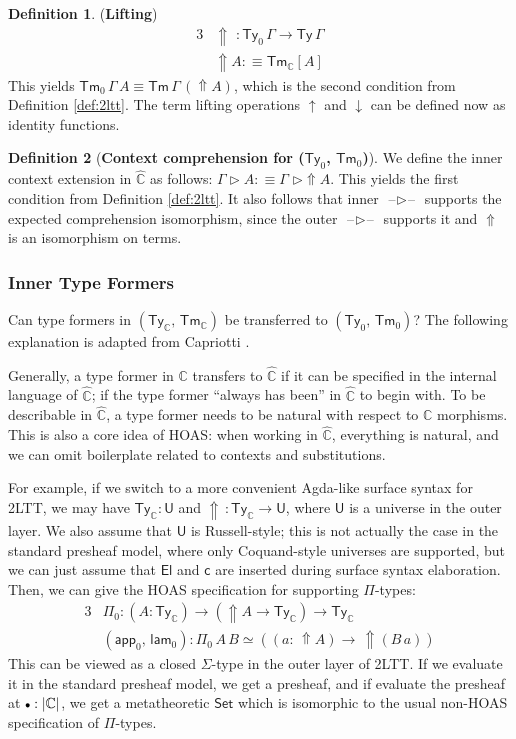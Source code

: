 \documentclass[12pt,a4paper,twoside,openany]{book}
\theoremstyle{remark}
\theoremstyle{definition}
\newtheorem{mydefinition}{Definition}
\newcommand{\ms}[1]{\mathsf{#1}}
\newcommand{\mbb}[1]{\mathbb{#1}}
\newcommand{\Tm}{\mathsf{Tm}}
\newcommand{\Ty}{\mathsf{Ty}}
\newcommand{\U}{\mathsf{U}}
\newcommand{\El}{\mathsf{El}}
\newcommand{\blank}{\mathord{\hspace{1pt}\text{--}\hspace{1pt}}}
\newcommand{\Set}{\mathsf{Set}}
\newcommand{\Lift}{\Uparrow}
\newcommand{\ext}{\triangleright}
\newcommand{\emptycon}{\scaleobj{.75}\bullet}
\newcommand{\app}{\ms{app}}
\newcommand{\mbbC}{\mbb{C}}
\newcommand{\hmbbC}{\hat{\mbb{C}}}
\newcommand{\lam}{\ms{lam}}
\newcommand{\up}{\uparrow}
\newcommand{\down}{\downarrow}
\newcommand{\defn}{:\equiv}
\begin{document}
\begin{mydefinition}(\textbf{Lifting})
\begin{alignat*}{3}
  & \Lift\,\,: \Ty_{0}\,\Gamma \to \Ty\,\Gamma \\
  & \Lift\!A \defn \Tm_{\mbbC}[A]
\end{alignat*}
This yields $\Tm_{0}\,\Gamma\,A \equiv
\Tm\,\Gamma\,(\Lift\!A)$, which is the second condition from
Definition \ref{def:2ltt}. The term lifting operations $\up$ and $\down$ can
be defined now as identity functions.
\end{mydefinition}

\begin{mydefinition}[\textbf{Context comprehension for ($\Ty_{0}$, $\Tm_{0}$)}]
We define the inner context extension in $\hmbbC$ as follows: $\Gamma \ext A
\defn \Gamma\,\,\ext\Lift\!A$. This yields the first condition from Definition
\ref{def:2ltt}. It also follows that inner $\blank\ext\blank$ supports the
expected comprehension isomorphism, since the outer $\blank\ext\blank$ supports
it and $\Lift$ is an isomorphism on terms.
\end{mydefinition}

\subsubsection{Inner Type Formers}

Can type formers in $(\Ty_{\mbbC},\,\Tm_{\mbbC})$ be transferred to
$(\Ty_0,\,\Tm_0)$? The following explanation is adapted from Capriotti
\cite[Section 2.3]{TODO}.

Generally, a type former in $\mbbC$ transfers to $\hmbbC$ if it can be specified
in the internal language of $\hmbbC$; if the type former ``always has been'' in
$\hmbbC$ to begin with. To be describable in $\hmbbC$, a type former needs to be
natural with respect to $\mbbC$ morphisms. This is also a core idea of HOAS: when
working in $\hmbbC$, everything is natural, and we can omit boilerplate related
to contexts and substitutions.

For example, if we switch to a more convenient Agda-like surface syntax for
2LTT, we may have $\Ty_{\mbbC} : \U$ and $\Lift\,: \Ty_{\mbbC} \to \U$,
where $\U$ is a universe in the outer layer. We also assume that $\U$ is
Russell-style; this is not actually the case in the standard presheaf model,
where only Coquand-style universes are supported, but we can just assume that
$\El$ and $\ms{c}$ are inserted during surface syntax elaboration. Then, we can
give the HOAS specification for supporting $\Pi$-types:
\begin{alignat*}{3}
  &\Pi_0           : (A : \Ty_{\mbbC}) \to (\Lift\! A \to \Ty_{\mbbC}) \to \Ty_{\mbbC}\\
  &(\app_0,\,\lam_0) : \Pi_0\,A\,B \simeq ((a :\,\Lift\! A) \to \,\Lift\!(B\,a))
\end{alignat*}
This can be viewed as a closed $\Sigma$-type in the outer layer of 2LTT.  If we
evaluate it in the standard presheaf model, we get a presheaf, and if evaluate
the presheaf at $\emptycon : |\mbbC|$, we get a metatheoretic $\Set$ which is
isomorphic to the usual non-HOAS specification of $\Pi$-types.
\end{document}
